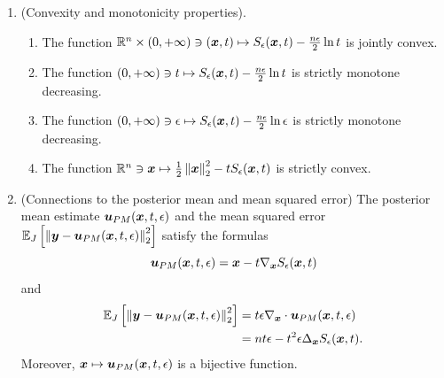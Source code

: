 \begin{prop}
\begin{enumerate}
\item[(ii)]  (Convexity and monotonicity properties).
\begin{enumerate}
    \item The function $\mathbb{R}^n\times(0,+\infty)\ni(\boldsymbol{x},t)\mapsto S_{\epsilon}(\boldsymbol{x},t)-\frac{n\epsilon}{2}\ln t$ is jointly convex.
    \item The function $(0,+\infty)\ni t\mapsto S_{\epsilon}(\boldsymbol{x},t)-\frac{n\epsilon}{2}\ln t$ is strictly monotone decreasing.
    \item The function $(0,+\infty)\ni\epsilon\mapsto S_{\epsilon}(\boldsymbol{x},t)-\frac{n\epsilon}{2}\ln\epsilon$ is strictly monotone decreasing.
    \item The function $\mathbb{R}^n \ni \boldsymbol{x} \mapsto \frac{1}{2}\left\Vert{\boldsymbol{x}} \right\Vert_{2}^{2} - tS_\epsilon(\boldsymbol{x},t)$ is strictly convex.
\end{enumerate}

\item[(iii)] (Connections to the posterior mean and mean squared error) The posterior mean estimate $\boldsymbol{u}_{PM}(\boldsymbol{x},t,\epsilon)$ and the mean squared error $\mathbb{E}_{J}\left [{\left \Vert \boldsymbol{y} - \boldsymbol{u}_{PM}(\boldsymbol{x},t,\epsilon) \right \Vert_{2}^{2}}\right]$ satisfy the formulas
\begin{equation} \label{eq:grad_s_eps}
    \boldsymbol{u}_{PM}(\boldsymbol{x},t,\epsilon) = \boldsymbol{x} - t\nabla_{\boldsymbol{x}}S_\epsilon(\boldsymbol{x},t)
\end{equation}
and
\begin{equation}\label{eq:exact_variance}
\begin{alignedat}{1}
    \mathbb{E}_{J}\left [{\left \Vert \boldsymbol{y} - \boldsymbol{u}_{PM}(\boldsymbol{x},t,\epsilon) \right \Vert_{2}^{2}}\right] &= t\epsilon \nabla_{\boldsymbol{x}}\cdot \boldsymbol{u}_{PM}(\boldsymbol{x},t,\epsilon) \\
    &= nt\epsilon - t^2\epsilon\Delta_{\boldsymbol x} S_{\epsilon}(\boldsymbol{x},t).
\end{alignedat}
\end{equation}
Moreover, $\boldsymbol{x} \mapsto \boldsymbol{u}_{PM}(\boldsymbol{x},t,\epsilon)$ is a bijective function.


\end{enumerate}
\end{prop}
